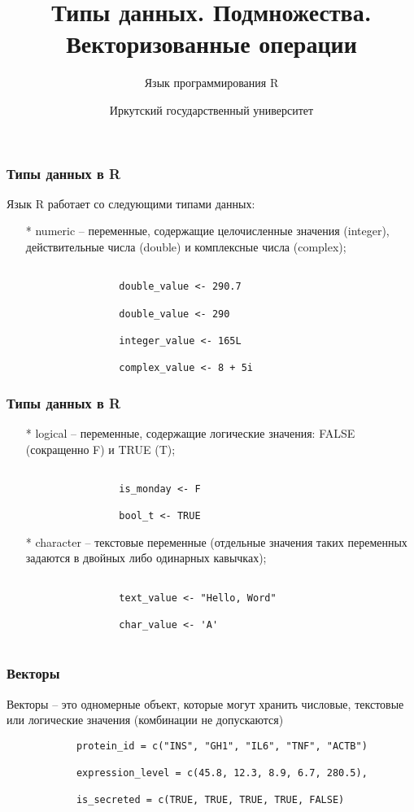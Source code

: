 \documentclass[10pt]{beamer}
\title{Типы данных. Подмножества. Векторизованные операции}
\subtitle{Язык программирования R}
\date{}
\author{Иркутский государственный университет}
\begin{document}
	\maketitle
	
	\begin{frame}[fragile]
		\frametitle{Типы данных в R}
		Язык R работает со следующими типами данных:
		\begin{itemize}
			\item[*] numeric – переменные, содержащие целочисленные значения (integer), действительные числа (double) и комплексные числа (complex);
			\begin{verbatim}
				
				double_value <- 290.7
				
				double_value <- 290
				
				integer_value <- 165L
				
				complex_value <- 8 + 5i
			\end{verbatim}	
		\end{itemize} 
	\end{frame} 
	
	\begin{frame}[fragile]
		\frametitle{Типы данных в R}
		\begin{itemize}
			\item[*] logical – переменные, содержащие логические значения: FALSE (сокращенно F) и TRUE (T);
			\begin{verbatim}
				
				is_monday <- F
				
				bool_t <- TRUE	
			\end{verbatim}	     
			\item[*] character – текстовые переменные (отдельные значения таких переменных задаются в двойных либо одинарных кавычках);
			
			\begin{verbatim}
				
				text_value <- "Hello, Word"
				
				char_value <- 'A'
				
			\end{verbatim}
		\end{itemize}    
	\end{frame}
	
	\begin{frame}[fragile]
		\frametitle{Векторы}
		Векторы – это одномерные объект, которые могут хранить числовые, текстовые или логические значения (комбинации не допускаются)
		\begin{verbatim}
			protein_id = c("INS", "GH1", "IL6", "TNF", "ACTB")
			
			expression_level = c(45.8, 12.3, 8.9, 6.7, 280.5),
			
			is_secreted = c(TRUE, TRUE, TRUE, TRUE, FALSE)
		\end{verbatim}
	\end{frame}
	
\end{document}
